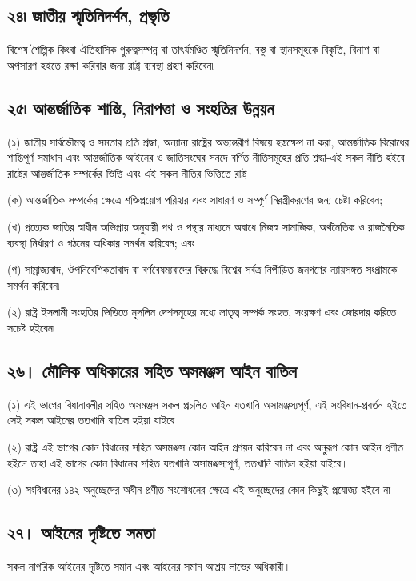 \documentclass[11pt]{article}
\begin{document}
\subsection{২৪৷ জাতীয় স্মৃতিনিদর্শন, প্রভৃতি}
\label{sec:org59f4505}
বিশেষ শৈল্পিক কিংবা ঐতিহাসিক গুরুত্বসম্পন্ন বা তাৎর্যমণ্ডিত স্মৃতিনিদর্শন, বস্তু
বা স্থানসমূহকে বিকৃতি, বিনাশ বা অপসারণ হইতে রক্ষা করিবার জন্য রাষ্ট্র ব্যবস্থা
গ্রহণ করিবেন৷

\subsection{২৫৷ আন্তর্জাতিক শান্তি, নিরাপত্তা ও সংহতির উন্নয়ন}
\label{sec:org9515b35}
(১) জাতীয় সার্বভৌমত্ব ও সমতার প্রতি শ্রদ্ধা, অন্যান্য রাষ্ট্রের অভ্যন্তরীণ বিষয়ে
    হস্তক্ষেপ না করা, আন্তর্জাতিক বিরোধের শান্তিপূর্ণ সমাধান এবং আন্তর্জাতিক আইনের
    ও জাতিসংঘের সনদে বর্ণিত নীতিসমূহের প্রতি শ্রদ্ধা-এই সকল নীতি হইবে রাষ্ট্রের
    আন্তর্জাতিক সম্পর্কের ভিত্তি এবং এই সকল নীতির ভিত্তিতে রাষ্ট্র

(ক) আন্তর্জাতিক সম্পর্কের ক্ষেত্রে শক্তিপ্রয়োগ পরিহার এবং সাধারণ ও সম্পূর্ণ
    নিরস্ত্রীকরণের জন্য চেষ্টা করিবেন;

(খ) প্রত্যেক জাতির স্বাধীন অভিপ্রায় অনুযায়ী পথ ও পন্থার মাধ্যমে অবাধে নিজস্ব
    সামাজিক, অর্থনৈতিক ও রাজনৈতিক ব্যবস্থা নির্ধারণ ও গঠনের অধিকার সমর্থন
    করিবেন; এবং

(গ) সাম্রাজ্যবাদ, ঔপনিবেশিকতাবাদ বা বর্ণবৈষম্যবাদের বিরুদ্ধে বিশ্বের সর্বত্র
    নিপীড়িত জনগণের ন্যায়সঙ্গত সংগ্রামকে সমর্থন করিবেন৷

(২) রাষ্ট্র ইসলামী সংহতির ভিত্তিতে মুসলিম দেশসমূহের মধ্যে ভ্রাতৃত্ব সম্পর্ক
    সংহত, সংরক্ষণ এবং জোরদার করিতে সচেষ্ট হইবেন৷

\subsection{২৬। মৌলিক অধিকারের সহিত অসমঞ্জস আইন বাতিল}
\label{sec:org24744ff}
(১) এই ভাগের বিধানাবলীর সহিত অসমঞ্জস সকল প্রচলিত আইন যতখানি অসামঞ্জস্যপূর্ণ,
    এই সংবিধান-প্রবর্তন হইতে সেই সকল আইনের ততখানি বাতিল হইয়া যাইবে।

(২) রাষ্ট্র এই ভাগের কোন বিধানের সহিত অসমঞ্জস কোন আইন প্রণয়ন করিবেন না এবং
    অনুরূপ কোন আইন প্রণীত হইলে তাহা এই ভাগের কোন বিধানের সহিত যতখানি
    অসামঞ্জস্যপূর্ণ, ততখানি বাতিল হইয়া যাইবে।

(৩) সংবিধানের ১৪২ অনুচ্ছেদের অধীন প্রণীত সংশোধনের ক্ষেত্রে এই অনুচ্ছেদের
   কোন কিছুই প্রযোজ্য হইবে না।

\subsection{২৭। আইনের দৃষ্টিতে সমতা}
\label{sec:org55966b1}
সকল নাগরিক আইনের দৃষ্টিতে সমান এবং আইনের সমান আশ্রয় লাভের অধিকারী।
\end{document}
